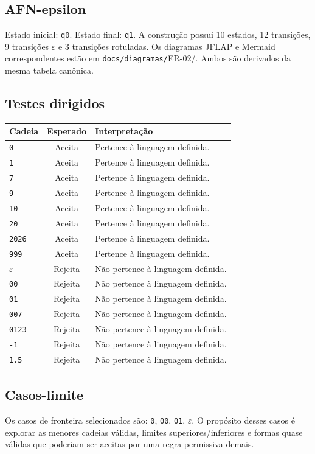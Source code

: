 \subsection{AFN-epsilon}
Estado inicial: \texttt{q0}. Estado final: \texttt{q1}. A construção possui 10 estados, 12 transições, 9 transições $\varepsilon$ e 3 transições rotuladas.
Os diagramas JFLAP e Mermaid correspondentes estão em \texttt{docs/diagramas/}ER-02/. Ambos são derivados da mesma tabela canônica.
\subsection{Testes dirigidos}
\begin{center}
\small
\begin{tabular}{|p{}|c|p{}|}
\toprule
Cadeia & Esperado & Interpretação \\
\midrule
\texttt{0} & Aceita & Pertence à linguagem definida. \\
\texttt{1} & Aceita & Pertence à linguagem definida. \\
\texttt{7} & Aceita & Pertence à linguagem definida. \\
\texttt{9} & Aceita & Pertence à linguagem definida. \\
\texttt{10} & Aceita & Pertence à linguagem definida. \\
\texttt{20} & Aceita & Pertence à linguagem definida. \\
\texttt{2026} & Aceita & Pertence à linguagem definida. \\
\texttt{999} & Aceita & Pertence à linguagem definida. \\
$\varepsilon$ & Rejeita & Não pertence à linguagem definida. \\
\texttt{00} & Rejeita & Não pertence à linguagem definida. \\
\texttt{01} & Rejeita & Não pertence à linguagem definida. \\
\texttt{007} & Rejeita & Não pertence à linguagem definida. \\
\texttt{0123} & Rejeita & Não pertence à linguagem definida. \\
\texttt{-1} & Rejeita & Não pertence à linguagem definida. \\
\texttt{1.5} & Rejeita & Não pertence à linguagem definida. \\
\bottomrule
\end{tabular}
\end{center}
\subsection{Casos-limite}
Os casos de fronteira selecionados são: \texttt{0}, \texttt{00}, \texttt{01}, $\varepsilon$.
\medskip
O propósito desses casos é explorar as menores cadeias válidas, limites superiores/inferiores e formas quase válidas que poderiam ser aceitas por uma regra permissiva demais.

